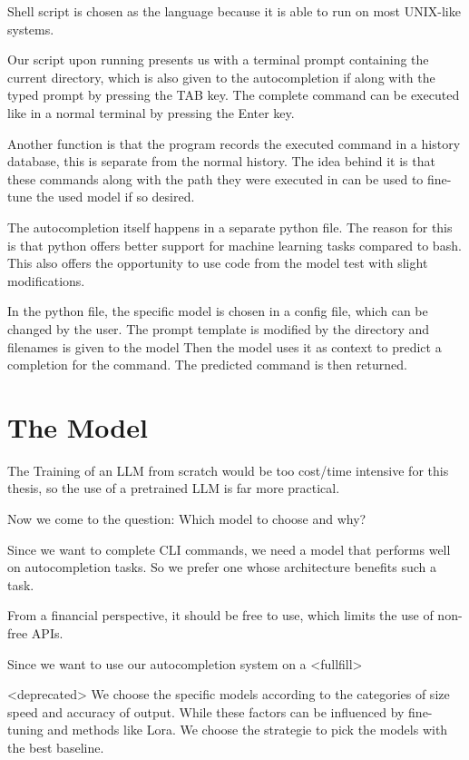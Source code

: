 Shell script is chosen as the  language because it is able to run on most UNIX-like systems.


Our script upon running presents us with a terminal prompt containing the current directory, which is also given to the autocompletion if along with the typed prompt by pressing the TAB key. The complete command can be executed like in a normal terminal by pressing the Enter key. 

Another function is that the program records the executed command in a history database, this is separate from the normal history. The idea behind it is that these commands along with the path they were executed in can be used to fine-tune the used model if so desired.


The autocompletion itself happens in a separate python file. The reason for this is that python offers better support for machine learning tasks compared to bash. This also offers the opportunity to use code from the model test with slight modifications.

In the python file, the specific model is chosen in a config file, which can be changed by the user.
The prompt template is modified by the directory and filenames is given to the model
Then the model uses it as context to predict  a completion for the command.
The predicted command is then returned.



\section{The Model}\raggedbottom
The Training of an LLM from scratch would be too  cost/time intensive for this thesis, so the use of a pretrained LLM is far more practical.


Now  we come to the question: Which model to choose and why? 

Since we want to complete CLI commands, we need a model that performs well on autocompletion tasks. So we prefer one whose architecture benefits such a task.


From a financial perspective, it should be free to use, which limits the use of non-free APIs.


Since we want to use our autocompletion system on a 
<fullfill>

<deprecated>
We choose the specific models according to the categories of size speed and accuracy of output. While these factors can be influenced by fine-tuning and methods like Lora. We choose the strategie to pick the models with the best baseline.


